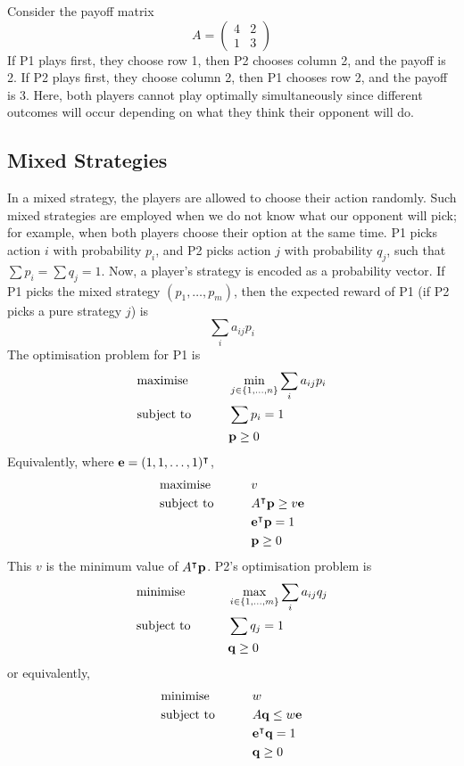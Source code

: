 \begin{example}
    Consider the payoff matrix
    \[ A = \begin{pmatrix}
        4 & 2 \\ 1 & 3
    \end{pmatrix} \]
    If P1 plays first, they choose row 1, then P2 chooses column 2, and the payoff is 2.
    If P2 plays first, they choose column 2, then P1 chooses row 2, and the payoff is 3.
    Here, both players cannot play optimally simultaneously since different outcomes will occur depending on what they think their opponent will do.
\end{example}

\subsection{Mixed Strategies}
In a mixed strategy, the players are allowed to choose their action randomly.
Such mixed strategies are employed when we do not know what our opponent will pick; for example, when both players choose their option at the same time.
P1 picks action \( i \) with probability \( p_i \), and P2 picks action \( j \) with probability \( q_j \), such that \( \sum p_i = \sum q_j = 1 \).
Now, a player's strategy is encoded as a probability vector.
If P1 picks the mixed strategy \( (p_1, \dots, p_m) \), then the expected reward of P1 (if P2 picks a pure strategy \( j \)) is
\[ \sum_i a_{ij} p_i \]
The optimisation problem for P1 is
\begin{alignat*}{2}
    & \text{maximise} & \qquad & \min_{j \in \qty{1,\dots,n}} \sum_i a_{ij} p_i            \\
    & \text{subject to}                                &        &\sum p_i = 1 \\
    & & & \vb p \geq 0
\end{alignat*}
Equivalently, where \( \vb e = (1,1,\dots,1)^\intercal \),
\begin{alignat*}{2}
    & \text{maximise} & \qquad & v            \\
    & \text{subject to}                                &        & A^\intercal \vb p \geq v \vb e \\
    & & & \vb e^\intercal \vb p = 1 \\
    & & & \vb p \geq 0
\end{alignat*}
This \( v \) is the minimum value of \( A^\intercal \vb p \).
P2's optimisation problem is
\begin{alignat*}{2}
    & \text{minimise} & \qquad & \max_{i \in \qty{1,\dots,m}} \sum_i a_{ij} q_j            \\
    & \text{subject to}                                &        &\sum q_j = 1 \\
    & & & \vb q \geq 0
\end{alignat*}
or equivalently,
\begin{alignat*}{2}
    & \text{minimise} & \qquad & w            \\
    & \text{subject to}                                &        & A \vb q \leq w \vb e \\
    & & & \vb e^\intercal \vb q = 1 \\
    & & & \vb q \geq 0
\end{alignat*}

